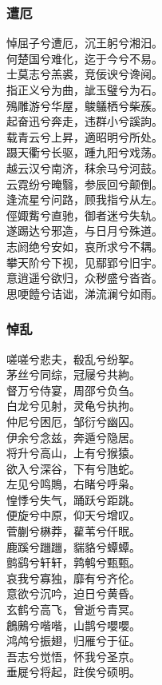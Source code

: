 \documentclass[]{article}
\begin{document}
\hypertarget{header-n3151}{%
\subsubsection{遭厄}\label{header-n3151}}

悼屈子兮遭厄，沉王躬兮湘汨。\\
何楚国兮难化，迄于今兮不易。\\
士莫志兮羔裘，竞佞谀兮谗阋。\\
指正义兮为曲，訿玉璧兮为石。\\
殦雕游兮华屋，鵔鸃栖兮柴蔟。\\
起奋迅兮奔走，违群小兮謑訽。\\
载青云兮上昇，適昭明兮所处。\\
蹑天衢兮长驱，踵九阳兮戏荡。\\
越云汉兮南济，秣余马兮河鼓。\\
云霓纷兮晻翳，参辰回兮颠倒。\\
逢流星兮问路，顾我指兮从左。\\
俓娵觜兮直驰，御者迷兮失轨。\\
遂踢达兮邪造，与日月兮殊道。\\
志阏绝兮安如，哀所求兮不耦。\\
攀天阶兮下视，见鄢郢兮旧宇。\\
意逍遥兮欲归，众秽盛兮沓沓。\\
思哽饐兮诘诎，涕流澜兮如雨。

\hypertarget{header-n3156}{%
\subsubsection{悼乱}\label{header-n3156}}

嗟嗟兮悲夫，殽乱兮纷挐。\\
茅丝兮同综，冠屦兮共絇。\\
督万兮侍宴，周邵兮负刍。\\
白龙兮见射，灵龟兮执拘。\\
仲尼兮困厄，邹衍兮幽囚。\\
伊余兮念兹，奔遁兮隐居。\\
将升兮高山，上有兮猴猿。\\
欲入兮深谷，下有兮虺蛇。\\
左见兮鸣鵙，右睹兮呼枭。\\
惶悸兮失气，踊跃兮距跳。\\
便旋兮中原，仰天兮增叹。\\
菅蒯兮楙莽，雚苇兮仟眠。\\
鹿蹊兮躖躖，貒貉兮蟫蟫。\\
鹯鹞兮轩轩，鹑鹌兮甄甄。\\
哀我兮寡独，靡有兮齐伦。\\
意欲兮沉吟，迫日兮黄昏。\\
玄鹤兮高飞，曾逝兮青冥。\\
鶬鶊兮喈喈，山鹊兮嚶嚶。\\
鸿鸬兮振翅，归雁兮于征。\\
吾志兮觉悟，怀我兮圣京。\\
垂屣兮将起，跓俟兮硕明。
\end{document}
